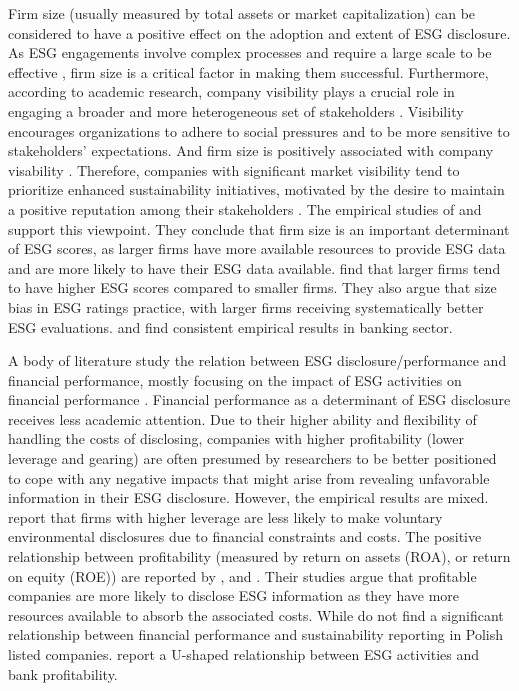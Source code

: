 \documentclass[
  authoryear]{elsarticle}
\begin{document}
Firm size (usually measured by total assets or market capitalization)
can be considered to have a positive effect on the adoption and extent
of ESG disclosure. As ESG engagements involve complex processes and
require a large scale to be effective \citep{YOUN2015}, firm size is a
critical factor in making them successful. Furthermore, according to
academic research, company visibility plays a crucial role in engaging a
broader and more heterogeneous set of stakeholders \citep{PELOZA2006}.
Visibility encourages organizations to adhere to social pressures and to
be more sensitive to stakeholders' expectations. And firm size is
positively associated with company visability \citep{MEZNAR1995}.
Therefore, companies with significant market visibility tend to
prioritize enhanced sustainability initiatives, motivated by the desire
to maintain a positive reputation among their stakeholders
\citep{DAMATO2020, ABDI2022}. The empirical studies of
\citet{FAVINO2019} and \citet{ALAREENI2020} support this viewpoint. They
conclude that firm size is an important determinant of ESG scores, as
larger firms have more available resources to provide ESG data and are
more likely to have their ESG data available. \citet{DREMPETIC2020} find
that larger firms tend to have higher ESG scores compared to smaller
firms. They also argue that size bias in ESG ratings practice, with
larger firms receiving systematically better ESG evaluations.
\citet{BUALLAY2019} and \citet{LAMANDA2024} find consistent empirical
results in banking sector.

A body of literature study the relation between ESG
disclosure/performance and financial performance, mostly focusing on the
impact of ESG activities on financial performance
\citep{FAVINO2019, BUALLAY2019, DAMATO2020, ABDI2022, LAMANDA2024}.
Financial performance as a determinant of ESG disclosure receives less
academic attention. Due to their higher ability and flexibility of
handling the costs of disclosing, companies with higher profitability
(lower leverage and gearing) are often presumed by researchers to be
better positioned to cope with any negative impacts that might arise
from revealing unfavorable information in their ESG disclosure. However,
the empirical results are mixed. \citet{BRAMMER2008} report that firms
with higher leverage are less likely to make voluntary environmental
disclosures due to financial constraints and costs. The positive
relationship between profitability (measured by return on assets (ROA),
or return on equity (ROE)) are reported by \citet{HADDOCK2005},
\citet{LIU2009} and \citet{GAMERSCHLAG2011}. Their studies argue that
profitable companies are more likely to disclose ESG information as they
have more resources available to absorb the associated costs. While
\citet{DYDUCH2017} do not find a significant relationship between
financial performance and sustainability reporting in Polish listed
companies. \citet{YUEN2022} report a U-shaped relationship between ESG
activities and bank profitability.
\end{document}
